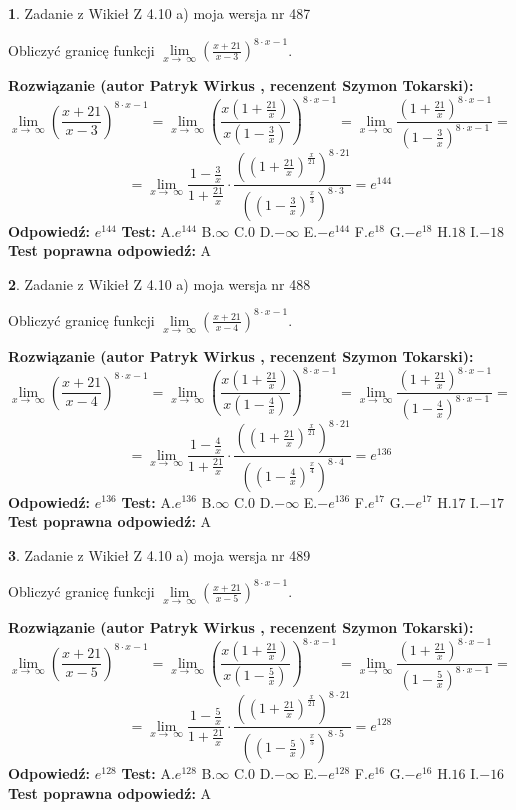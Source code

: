 \documentclass[12pt, a4paper]{article}
\theoremstyle{definition} %
\newtheorem{zad}{}
\newcommand{\zadStart}[1]{\begin{zad}#1\newline}
\newcommand{\zadStop}{\end{zad}}
\newcommand{\rozwStart}[2]{\noindent \textbf{Rozwiązanie (autor #1 , recenzent #2): }\newline}
\newcommand{\rozwStop}{\newline}
\newcommand{\odpStart}{\noindent \textbf{Odpowiedź:}\newline}
\newcommand{\odpStop}{\newline}
\newcommand{\testStart}{\noindent \textbf{Test:}\newline}
\newcommand{\testStop}{\newline}
\newcommand{\kluczStart}{\noindent \textbf{Test poprawna odpowiedź:}\newline}
\newcommand{\kluczStop}{\newline}
\begin{document}
\zadStart{Zadanie z Wikieł Z 4.10 a) moja wersja nr 487}

Obliczyć granicę funkcji  $\lim\limits_{x\to\ \infty}(\frac{x+21}{x-3})^{8\cdot x-1}$.
\zadStop
\rozwStart{Patryk Wirkus}{Szymon Tokarski}
$$\lim\limits_{x\to\ \infty}(\frac{x+21}{x-3})^{8\cdot x-1} = \lim\limits_{x\to\ \infty}(\frac{x(1+\frac{21}{x})}{x(1-\frac{3}{x})})^{8\cdot x-1}=\lim\limits_{x\to\ \infty}\frac{(1+\frac{21}{x})^{8\cdot x-1}}{(1-\frac{3}{x})^{8\cdot x-1}}=$$
$$=\lim\limits_{x\to\ \infty}\frac{1-\frac{3}{x}}{1+\frac{21}{x}}\cdot\frac{((1+\frac{21}{x})^{\frac{x}{21}})^{8\cdot21}}{((1-\frac{3}{x})^{\frac{x}{3}})^{8\cdot3}}=e^{144}$$
\rozwStop
\odpStart
$e^{144}$
\odpStop
\testStart
A.$e^{144}$ B.$\infty$ C.$0$ D.$-\infty$ E.$-e^{144}$
F.$e^{18}$ G.$-e^{18}$
H.$18$
I.$-18$
\testStop
\kluczStart
A
\kluczStop



\zadStart{Zadanie z Wikieł Z 4.10 a) moja wersja nr 488}

Obliczyć granicę funkcji  $\lim\limits_{x\to\ \infty}(\frac{x+21}{x-4})^{8\cdot x-1}$.
\zadStop
\rozwStart{Patryk Wirkus}{Szymon Tokarski}
$$\lim\limits_{x\to\ \infty}(\frac{x+21}{x-4})^{8\cdot x-1} = \lim\limits_{x\to\ \infty}(\frac{x(1+\frac{21}{x})}{x(1-\frac{4}{x})})^{8\cdot x-1}=\lim\limits_{x\to\ \infty}\frac{(1+\frac{21}{x})^{8\cdot x-1}}{(1-\frac{4}{x})^{8\cdot x-1}}=$$
$$=\lim\limits_{x\to\ \infty}\frac{1-\frac{4}{x}}{1+\frac{21}{x}}\cdot\frac{((1+\frac{21}{x})^{\frac{x}{21}})^{8\cdot21}}{((1-\frac{4}{x})^{\frac{x}{4}})^{8\cdot4}}=e^{136}$$
\rozwStop
\odpStart
$e^{136}$
\odpStop
\testStart
A.$e^{136}$ B.$\infty$ C.$0$ D.$-\infty$ E.$-e^{136}$
F.$e^{17}$ G.$-e^{17}$
H.$17$
I.$-17$
\testStop
\kluczStart
A
\kluczStop



\zadStart{Zadanie z Wikieł Z 4.10 a) moja wersja nr 489}

Obliczyć granicę funkcji  $\lim\limits_{x\to\ \infty}(\frac{x+21}{x-5})^{8\cdot x-1}$.
\zadStop
\rozwStart{Patryk Wirkus}{Szymon Tokarski}
$$\lim\limits_{x\to\ \infty}(\frac{x+21}{x-5})^{8\cdot x-1} = \lim\limits_{x\to\ \infty}(\frac{x(1+\frac{21}{x})}{x(1-\frac{5}{x})})^{8\cdot x-1}=\lim\limits_{x\to\ \infty}\frac{(1+\frac{21}{x})^{8\cdot x-1}}{(1-\frac{5}{x})^{8\cdot x-1}}=$$
$$=\lim\limits_{x\to\ \infty}\frac{1-\frac{5}{x}}{1+\frac{21}{x}}\cdot\frac{((1+\frac{21}{x})^{\frac{x}{21}})^{8\cdot21}}{((1-\frac{5}{x})^{\frac{x}{5}})^{8\cdot5}}=e^{128}$$
\rozwStop
\odpStart
$e^{128}$
\odpStop
\testStart
A.$e^{128}$ B.$\infty$ C.$0$ D.$-\infty$ E.$-e^{128}$
F.$e^{16}$ G.$-e^{16}$
H.$16$
I.$-16$
\testStop
\kluczStart
A
\kluczStop
\end{document}
